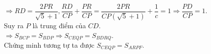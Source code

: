 \begin{ex}
{\begin{enumerate}
{
}
$\Rightarrow RD=\dfrac{2PR}{\sqrt{5}+1}, \dfrac{RD}{CP}+\dfrac{PR}{CP}=\dfrac{2PR}{CP(\sqrt{5}+1)}+\dfrac{1}{c}=1\Rightarrow \dfrac{PD}{CP}=1$.\\
Suy ra $P$ là trung điểm của $CD$.\\
$\Rightarrow S_{BCP}=S_{BDP}\Rightarrow S_{CEQP}=S_{BDRQ}$.\\
Chứng minh tương tự ta được $S_{CEQP}=S_{ARPF}$.

 
\end{enumerate}
}
\end{ex}



